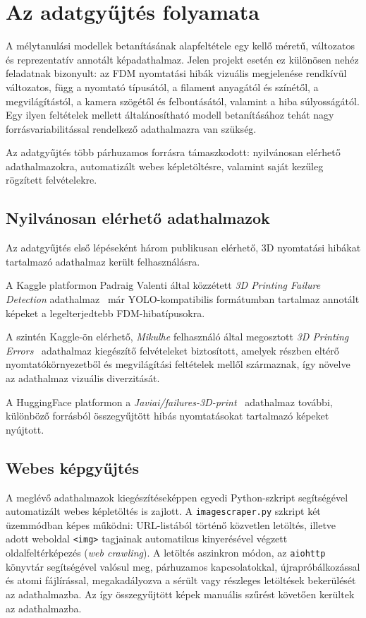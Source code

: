 \section{Az adatgyűjtés folyamata}

A mélytanulási modellek betanításának alapfeltétele egy kellő méretű, változatos és reprezentatív
annotált képadathalmaz. Jelen projekt esetén ez különösen nehéz feladatnak bizonyult: az FDM
nyomtatási hibák vizuális megjelenése rendkívül változatos, függ a nyomtató típusától, a filament
anyagától és színétől, a megvilágítástól, a kamera szögétől és felbontásától, valamint a hiba
súlyosságától. Egy ilyen feltételek mellett általánosítható modell betanításához tehát nagy forrásvariabilitással rendelkező adathalmazra van szükség.

Az adatgyűjtés több párhuzamos forrásra támaszkodott: nyilvánosan elérhető adathalmazokra,
automatizált webes képletöltésre, valamint saját kezűleg rögzített felvételekre.

    \subsection{Nyilvánosan elérhető adathalmazok}

    Az adatgyűjtés első lépéseként három publikusan elérhető, 3D nyomtatási hibákat tartalmazó
    adathalmaz került felhasználásra.

    A Kaggle platformon Padraig Valenti által közzétett \textit{3D Printing Failure Detection}
    adathalmaz~\cite{kaggle_valenti} már YOLO-kompatibilis formátumban tartalmaz annotált képeket
    a legelterjedtebb FDM-hibatípusokra.

    A szintén Kaggle-ön elérhető, \textit{Mikulhe} felhasználó által megosztott \textit{3D Printing
    Errors}~\cite{kaggle_mikulhe} adathalmaz kiegészítő felvételeket biztosított, amelyek részben
    eltérő nyomtatókörnyezetből és megvilágítási feltételek mellől származnak, így növelve az
    adathalmaz vizuális diverzitását.

    A HuggingFace platformon a \textit{Javiai/failures-3D-print}~\cite{hf_javiai} adathalmaz
    további, különböző forrásból összegyűjtött hibás nyomtatásokat tartalmazó képeket nyújtott.

    \subsection{Webes képgyűjtés}

    A meglévő adathalmazok kiegészítéseképpen egyedi Python-szkript segítségével automatizált
    webes képletöltés is zajlott. A \texttt{imagescraper.py} szkript két üzemmódban képes működni:
    URL-listából történő közvetlen letöltés, illetve adott weboldal \texttt{<img>} tagjainak
    automatikus kinyerésével végzett oldalfeltérképezés (\textit{web crawling}).
    A letöltés aszinkron módon, az \texttt{aiohttp} könyvtár segítségével valósul meg, párhuzamos
    kapcsolatokkal, újrapróbálkozással és atomi fájlírással, megakadályozva a sérült vagy
    részleges letöltések bekerülését az adathalmazba. Az így összegyűjtött képek manuális
    szűrést követően kerültek az adathalmazba.


